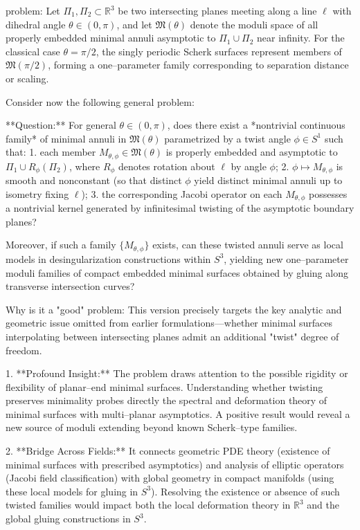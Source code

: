 problem:  
Let $\Pi_1, \Pi_2 \subset \mathbb{R}^3$ be two intersecting planes meeting along a line $\ell$ with dihedral angle $\theta \in (0,\pi)$, and let $\mathfrak{M}(\theta)$ denote the moduli space of all properly embedded minimal annuli asymptotic to $\Pi_1 \cup \Pi_2$ near infinity. For the classical case $\theta = \pi/2$, the singly periodic Scherk surfaces represent members of $\mathfrak{M}(\pi/2)$, forming a one–parameter family corresponding to separation distance or scaling.  

Consider now the following general problem:

**Question:**  
For general $\theta \in (0,\pi)$, does there exist a *nontrivial continuous family* of minimal annuli in $\mathfrak{M}(\theta)$ parametrized by a twist angle $\phi \in S^1$ such that:
1. each member $M_{\theta,\phi} \in \mathfrak{M}(\theta)$ is properly embedded and asymptotic to $\Pi_1 \cup R_\phi(\Pi_2)$, where $R_\phi$ denotes rotation about $\ell$ by angle $\phi$;
2. $\phi \mapsto M_{\theta,\phi}$ is smooth and nonconstant (so that distinct $\phi$ yield distinct minimal annuli up to isometry fixing $\ell$);
3. the corresponding Jacobi operator on each $M_{\theta,\phi}$ possesses a nontrivial kernel generated by infinitesimal twisting of the asymptotic boundary planes?

Moreover, if such a family $\{M_{\theta,\phi}\}$ exists, can these twisted annuli serve as local models in desingularization constructions within $S^3$, yielding new one–parameter moduli families of compact embedded minimal surfaces obtained by gluing along transverse intersection curves?

Why is it a "good" problem:  
This version precisely targets the key analytic and geometric issue omitted from earlier formulations—whether minimal surfaces interpolating between intersecting planes admit an additional "twist" degree of freedom.  

1. **Profound Insight:**  
The problem draws attention to the possible rigidity or flexibility of planar–end minimal surfaces. Understanding whether twisting preserves minimality probes directly the spectral and deformation theory of minimal surfaces with multi–planar asymptotics. A positive result would reveal a new source of moduli extending beyond known Scherk–type families.  

2. **Bridge Across Fields:**  
It connects geometric PDE theory (existence of minimal surfaces with prescribed asymptotics) and analysis of elliptic operators (Jacobi field classification) with global geometry in compact manifolds (using these local models for gluing in $S^3$). Resolving the existence or absence of such twisted families would impact both the local deformation theory in $\mathbb{R}^3$ and the global gluing constructions in $S^3$.  

